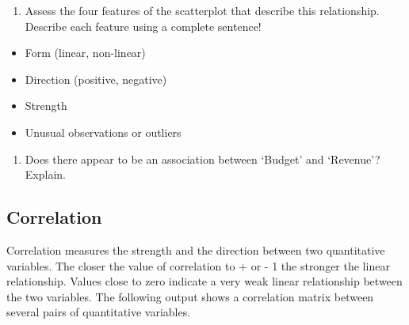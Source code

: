 \documentclass[
]{report}
\providecommand{\tightlist}{%
  \setlength{\itemsep}{0pt}\setlength{\parskip}{0pt}}
\begin{document}
\begin{enumerate}
\def\labelenumi{\arabic{enumi}.}
\setcounter{enumi}{2}
\tightlist
\item
  Assess the four features of the scatterplot that describe this relationship. Describe each feature using a complete sentence!
\end{enumerate}

\begin{itemize}
\tightlist
\item
  Form (linear, non-linear)
\end{itemize}

\vspace{.5in}

\begin{itemize}
\tightlist
\item
  Direction (positive, negative)
\end{itemize}

\vspace{.5in}

\begin{itemize}
\tightlist
\item
  Strength
\end{itemize}

\vspace{.5in}

\begin{itemize}
\tightlist
\item
  Unusual observations or outliers
\end{itemize}

\vspace{.5in}

\begin{enumerate}
\def\labelenumi{\arabic{enumi}.}
\setcounter{enumi}{3}
\tightlist
\item
  Does there appear to be an association between `Budget' and `Revenue'? Explain.
\end{enumerate}

\vspace{1in}

\hypertarget{correlation}{%
\subsection{Correlation}\label{correlation}}

Correlation measures the strength and the direction between two quantitative variables. The closer the value of correlation to + or - 1 the stronger the linear relationship. Values close to zero indicate a very weak linear relationship between the two variables. The following output shows a correlation matrix between several pairs of quantitative variables.
\end{document}
